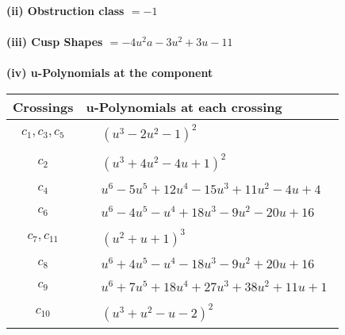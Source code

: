 \documentclass[1p]{elsarticle_modified}
\theoremstyle{definition}
\begin{document}
\flushleft \textbf{(ii) Obstruction class $= -1$}\\~\\
\flushleft \textbf{(iii) Cusp Shapes $= -4 u^2 a-3 u^2+3 u-11$}\\~\\
\newpage\renewcommand{\arraystretch}{1}
\flushleft \textbf{(iv) u-Polynomials at the component}\newline \\
\begin{tabular}{m{50pt}|m{274pt}}
Crossings & \hspace{64pt}u-Polynomials at each crossing \\
\hline $$\begin{aligned}c_{1},c_{3},c_{5}\end{aligned}$$&$\begin{aligned}
&(u^3-2 u^2-1)^2
\end{aligned}$\\
\hline $$\begin{aligned}c_{2}\end{aligned}$$&$\begin{aligned}
&(u^3+4 u^2-4 u+1)^2
\end{aligned}$\\
\hline $$\begin{aligned}c_{4}\end{aligned}$$&$\begin{aligned}
&u^6-5 u^5+12 u^4-15 u^3+11 u^2-4 u+4
\end{aligned}$\\
\hline $$\begin{aligned}c_{6}\end{aligned}$$&$\begin{aligned}
&u^6-4 u^5- u^4+18 u^3-9 u^2-20 u+16
\end{aligned}$\\
\hline $$\begin{aligned}c_{7},c_{11}\end{aligned}$$&$\begin{aligned}
&(u^2+u+1)^3
\end{aligned}$\\
\hline $$\begin{aligned}c_{8}\end{aligned}$$&$\begin{aligned}
&u^6+4 u^5- u^4-18 u^3-9 u^2+20 u+16
\end{aligned}$\\
\hline $$\begin{aligned}c_{9}\end{aligned}$$&$\begin{aligned}
&u^6+7 u^5+18 u^4+27 u^3+38 u^2+11 u+1
\end{aligned}$\\
\hline $$\begin{aligned}c_{10}\end{aligned}$$&$\begin{aligned}
&(u^3+u^2- u-2)^2
\end{aligned}$\\
\hline
\end{tabular}\\~\\
\end{document}
